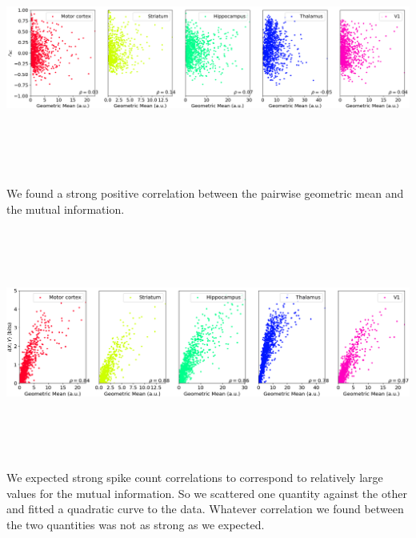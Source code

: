 \documentclass[a0,portrait]{a0poster}
\begin{document}
\begin{multicols}{2}
\includegraphics[width=\linewidth, height=7.5cm]{correlation_vs_geometric_mean.png}

We found a strong positive correlation between the pairwise geometric mean and the mutual information.

\includegraphics[width=\linewidth, height=7.5cm]{info_vs_geometric_mean.png}

We expected strong spike count correlations to correspond to relatively large values for the mutual information. So we scattered one quantity against the other and fitted a quadratic curve to the data. Whatever correlation we found between the two quantities was not as strong as we expected.


\end{multicols}
\end{document}
